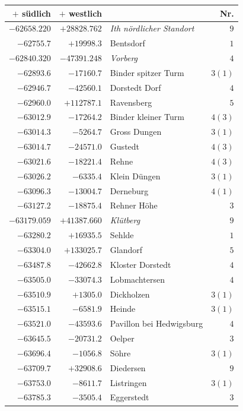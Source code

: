 \clearpage{}%
\begin{center}\begingroup\fontsize{8}{9}\selectfont
\setlength{\tabcolsep}{4pt}
\begin{tabular}{r|r|p{170pt}|r}\hline
\(+\) südlich&\(+\) westlich&&Nr.\\\hline
\(-62658.220\)&\(+28828.762\)&\textit{Ith nördlicher Standort}&\(9\)\\
\(-62755.7\)&\(+19998.3\)&Bentsdorf&\(1\)\\
\(-62840.320\)&\(-47391.248\)&\textit{Vorberg}&\(4\)\\
\(-62893.6\)&\(-17160.7\)&Binder spitzer Turm&\(3 (1)\)\\
\(-62946.7\)&\(-42560.1\)&Dorstedt Dorf&\(4\)\\
\(-62960.0\)&\(+112787.1\)&Ravensberg&\(5\)\\
\(-63012.9\)&\(-17264.2\)&Binder kleiner Turm&\(4 (3)\)\\
\(-63014.3\)&\(-5264.7\)&Gross Dungen&\(3 (1)\)\\
\(-63014.7\)&\(-24571.0\)&Gustedt&\(4 (3)\)\\
\(-63021.6\)&\(-18221.4\)&Rehne&\(4 (3)\)\\
\(-63026.2\)&\(-6335.4\)&Klein Düngen&\(3 (1)\)\\
\(-63096.3\)&\(-13004.7\)&Derneburg&\(4 (1)\)\\
\(-63127.2\)&\(-18875.4\)&Rehner Höhe&\(3\)\\
\(-63179.059\)&\(+41387.660\)&\textit{Klütberg}&\(9\)\\
\(-63280.2\)&\(+16935.5\)&Sehlde&\(1\)\\
\(-63304.0\)&\(+133025.7\)&Glandorf&\(5\)\\
\(-63487.8\)&\(-42662.8\)&Kloster Dorstedt&\(4\)\\
\(-63505.0\)&\(-33074.3\)&Lobmachtersen&\(4\)\\
\(-63510.9\)&\(+1305.0\)&Dickholzen&\(3 (1)\)\\
\(-63515.1\)&\(-6581.9\)&Heinde&\(3 (1)\)\\
\(-63521.0\)&\(-43593.6\)&Pavillon bei Hedwigsburg&\(4\)\\
\(-63645.5\)&\(-20731.2\)&Oelper&\(3\)\\
\(-63696.4\)&\(-1056.8\)&Söhre&\(3 (1)\)\\
\(-63709.7\)&\(+32908.6\)&Diedersen&\(9\)\\
\(-63753.0\)&\(-8611.7\)&Listringen&\(3 (1)\)\\
\(-63785.3\)&\(-3505.4\)&Eggerstedt&\(3\)\\

\end{tabular}
\end{center}
